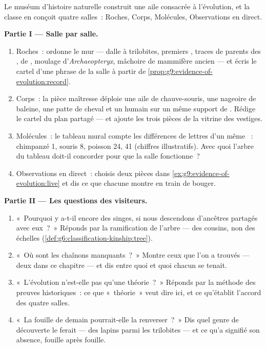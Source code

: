 \begin{problem}\label{pb:g9:evidence-of-evolution:1}
Le muséum d'histoire naturelle construit une aile
consacrée à l'évolution, et la classe en conçoit quatre
salles~: Roches, Corps, Molécules, Observations en direct.

\medskip\noindent\textbf{Partie I --- Salle par salle.}
\begin{enumerate}
  \item Roches~: ordonne le mur --- dalle à trilobites,
        premiers , traces de parents des
        ,  de , moulage
        d'\emph{Archaeopteryx}, mâchoire de mammifère
        ancien --- et écris le cartel d'une phrase de la
        salle à partir de
        \cref{prop:g9:evidence-of-evolution:record}.
  \item Corps~: la pièce maîtresse déploie une aile de
        chauve-souris, une nageoire de baleine, une patte
        de cheval et un  humain sur un même support de
        . Rédige le cartel du plan partagé --- et
        ajoute les trois pièces de la vitrine des vestiges.
  \item Molécules~: le tableau mural compte les différences
        de lettres d'un même ~: chimpanzé 1, souris 8,
        poisson 24,  41 (chiffres illustratifs). Avec
        quoi l'arbre du tableau doit-il concorder pour que
        la salle fonctionne~?
  \item Observations en direct~: choisis deux pièces dans
        \cref{ex:g9:evidence-of-evolution:live} et dis ce
        que chacune montre en train de bouger.
\end{enumerate}

\medskip\noindent\textbf{Partie II --- Les questions des
visiteurs.}
\begin{enumerate}[resume]
  \item «~Pourquoi y a-t-il encore des singes, si nous
        descendons d'ancêtres partagés avec eux~?~»
        Réponds par la ramification de l'arbre --- des
        cousins, non des échelles
        (\cref{def:g6:classification-kinship:tree}).
  \item «~Où sont les chaînons manquants~?~» Montre ceux
        que l'on a trouvés --- deux dans ce chapitre ---
        et dis entre quoi et quoi chacun se tenait.
  \item «~L'évolution n'est-elle pas qu'une théorie~?~»
        Réponds par la méthode des preuves historiques~: ce
        que «~théorie~» veut dire ici, et ce qu'établit
        l'accord des quatre salles.
  \item «~La fouille de demain pourrait-elle la renverser~?~»
        Dis quel genre de découverte le ferait --- des
        lapins parmi les trilobites --- et ce qu'a
        signifié son absence, fouille après fouille.
\end{enumerate}


\end{problem}
